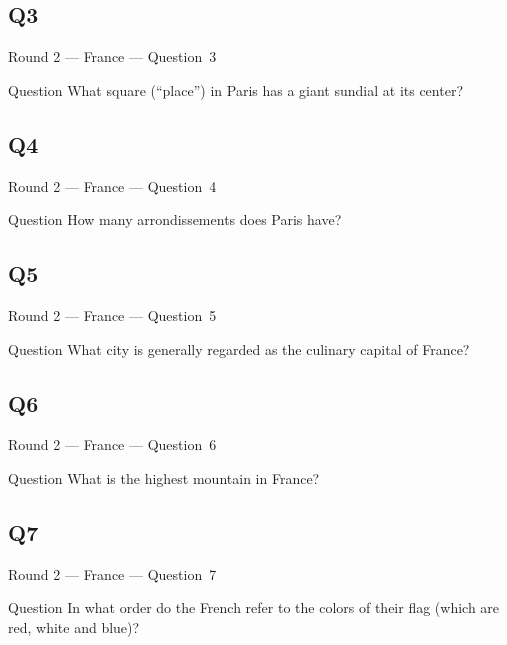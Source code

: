 \documentclass[11pt]{beamer}
\begin{document}
\subsection*{Q3}
\begin{frame}[t]{Round 2 --- France --- \mbox{Question 3}}
\begin{block}{Question}
What square (``place'') in Paris has a giant sundial at its center?
\end{block}
\end{frame}
\subsection*{Q4}
\begin{frame}[t]{Round 2 --- France --- \mbox{Question 4}}
\begin{block}{Question}
How many arrondissements does Paris have?
\end{block}
\end{frame}
\subsection*{Q5}
\begin{frame}[t]{Round 2 --- France --- \mbox{Question 5}}
\begin{block}{Question}
What city is generally regarded as the culinary capital of France?
\end{block}
\end{frame}
\subsection*{Q6}
\begin{frame}[t]{Round 2 --- France --- \mbox{Question 6}}
\begin{block}{Question}
What is the highest mountain in France?
\end{block}
\end{frame}
\subsection*{Q7}
\begin{frame}[t]{Round 2 --- France --- \mbox{Question 7}}
\begin{block}{Question}
In what order do the French refer to the colors of their flag (which are red, white and blue)?
\end{block}
\end{frame}
\end{document}
